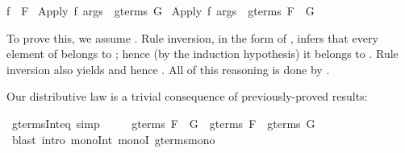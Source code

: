\begin{isabellebody}
\begin{isamarkuptxt}
\begin{isabelle}
f\ {}\ F{}\isanewline
{}\ Apply\ f\ args\ {}\ gterms\ G\ {}\isanewline
{}Apply\ f\ args\ {}\ gterms\ {}F\ {}\ G{}%
\end{isabelle}
To prove this, we assume .  Rule inversion,
in the form of , infers
that every element of  belongs to 
; hence (by the induction hypothesis) it belongs
to .  Rule inversion also yields
 and hence . 
All of this reasoning is done by .

\smallskip
Our distributive law is a trivial consequence of previously-proved results:%
\end{isamarkuptxt}%
\isamarkuptrue%
%
\endisatagproof
{\isafoldproof}%
%
\isadelimproof
%
\endisadelimproof
{}\isamarkupfalse%
\ gterms{}Int{}eq\ {}simp{}{}\isanewline
\ \ \ \ \ {}gterms\ {}F\ {}\ G{}\ {}\ gterms\ F\ {}\ gterms\ G{}\isanewline
%
\isadelimproof
%
\endisadelimproof
%
\isatagproof
{}\isamarkupfalse%
\ {}blast\ intro{}{}\ mono{}Int\ monoI\ gterms{}mono{}%
\endisatagproof
{\isafoldproof}%
%
\isadelimproof
%
\endisadelimproof
%
%



\end{isabellebody}
